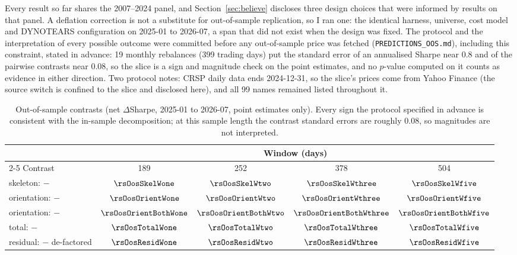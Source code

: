 Every result so far shares the 2007--2024 panel, and
Section~\ref{sec:believe} discloses three design choices that were
informed by results on that panel. A deflation correction is not a
substitute for out-of-sample replication, so I ran one: the identical
harness, universe, cost model and DYNOTEARS configuration on
2025-01 to 2026-07, a span that did not exist when the design was
fixed. The protocol and the interpretation of every possible outcome
were committed before any out-of-sample price was fetched
(\texttt{PREDICTIONS\_OOS.md}), including this constraint, stated in
advance: 19 monthly rebalances (399 trading days) put the standard
error of an annualised Sharpe near $0.8$ and of the pairwise contrasts
near $0.08$, so the slice is a sign and magnitude check on the
point estimates, and no $p$-value computed on it counts as evidence in
either direction. Two protocol notes: CRSP daily data ends 2024-12-31,
so the slice's prices come from Yahoo Finance (the source switch is
confined to the slice and disclosed here), and all 99 names remained
listed throughout it.

\begin{table}[t]
  \centering
  \caption{Out-of-sample contrasts (net $\Delta$Sharpe,
    2025-01 to 2026-07, point estimates only). Every sign the
    protocol specified in advance is consistent with the in-sample
    decomposition;
    at this sample length the contrast standard errors are roughly
    $0.08$, so magnitudes are not interpreted.}
  \label{tab:oos}
  \small
  \begin{tabular}{l c c c c}
    \toprule
    & \multicolumn{4}{c}{Window (days)} \\
    \cmidrule(lr){2-5}
    Contrast & 189 & 252 & 378 & 504 \\
    \midrule
    skeleton: \skelsamp{} $-$ \HRP{}          & $\rsOosSkelWone$ & $\rsOosSkelWtwo$ & $\rsOosSkelWthree$ & $\rsOosSkelWfive$ \\
    orientation: \skelsem{} $-$ \skelsamp{}   & $\rsOosOrientWone$ & $\rsOosOrientWtwo$ & $\rsOosOrientWthree$ & $\rsOosOrientWfive$ \\
    orientation: \orientsem{} $-$ \skelsamp{} & $\rsOosOrientBothWone$ & $\rsOosOrientBothWtwo$ & $\rsOosOrientBothWthree$ & $\rsOosOrientBothWfive$ \\
    total: \skelsem{} $-$ \HRP{}              & $\rsOosTotalWone$ & $\rsOosTotalWtwo$ & $\rsOosTotalWthree$ & $\rsOosTotalWfive$ \\
    residual: \skelsem{} $-$ de-factored      & $\rsOosResidWone$ & $\rsOosResidWtwo$ & $\rsOosResidWthree$ & $\rsOosResidWfive$ \\
    \bottomrule
  \end{tabular}
\end{table}

